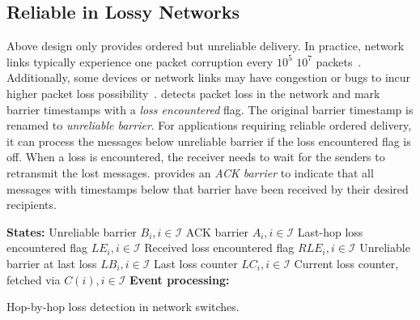 \subsection{Reliable \sys in Lossy Networks}
\label{sec:lossy}

Above design only provides ordered but unreliable delivery.
In practice, network links typically experience one packet corruption every $10^5$ \texttildelow $10^7$ packets~\cite{zhuo2017understanding}.
Additionally, some devices or network links may have congestion or bugs to incur higher packet loss possibility~\cite{guo2015pingmesh}.
\sys detects packet loss in the network and mark barrier timestamps with a \textit{loss encountered} flag.
The original barrier timestamp is renamed to \textit{unreliable barrier}.
For applications requiring reliable ordered delivery, it can process the messages below unreliable barrier if the loss encountered flag is off.
When a loss is encountered, the receiver needs to wait for the senders to retransmit the lost messages.
\sys provides an \textit{ACK barrier} to indicate that all messages with timestamps below that barrier have been received by their desired recipients.

\setlength{\textfloatsep}{1em}
\begin{algorithm}[t]
 \DontPrintSemicolon
 \textbf{States:} Unreliable barrier $B_i, i \in \mathcal{I}$\;
 	\qquad ACK barrier $A_i, i \in \mathcal{I}$\;
 	\qquad Last-hop loss encountered flag $LE_i, i \in \mathcal{I}$\;
    \qquad Received loss encountered flag $RLE_i, i \in \mathcal{I}$\;
    \qquad Unreliable barrier at last loss $LB_i, i \in \mathcal{I}$\;
    \qquad Last loss counter $LC_i, i \in \mathcal{I}$\;
    \qquad Current loss counter, fetched via $C(i), i \in \mathcal{I}$\;
 \textbf{Event processing:}\\
 \caption{Hop-by-hop loss detection in network switches.}
 \label{alg:loss-detection}
\end{algorithm}

